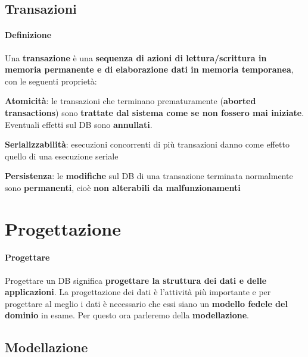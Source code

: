 \documentclass[10pt]{book}
\begin{document}
\subsection{Transazioni}
\paragraph{Definizione} Una \textbf{transazione} è una \textbf{sequenza di azioni di lettura/scrittura in memoria permanente e di elaborazione dati in memoria temporanea}, con le seguenti proprietà:
\begin{list}{}{}
	\item \textbf{Atomicità}: le transazioni che terminano prematuramente (\textbf{aborted transactions}) sono \textbf{trattate dal sistema come se non fossero mai iniziate}. Eventuali effetti sul DB sono \textbf{annullati}.
	\item \textbf{Serializzabilità}: esecuzioni concorrenti di più transazioni danno come effetto quello di una esecuzione seriale
	\item \textbf{Persistenza}: le \textbf{modifiche} sul DB di una transazione terminata normalmente sono \textbf{permanenti}, cioè \textbf{non alterabili da malfunzionamenti}
\end{list}
\section{Progettazione}
\paragraph{Progettare} Progettare un DB significa \textbf{progettare la struttura dei dati e delle applicazioni}. La progettazione dei dati è l'attività più importante e per progettare al meglio i dati è necessario che essi siano un \textbf{modello fedele del dominio} in esame. Per questo ora parleremo della \textbf{modellazione}.
\subsection{Modellazione}
\end{document}
